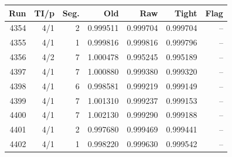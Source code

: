 \begin{tabular}{rrrrrrr}\toprule Run & TI/p & Seg. & Old & Raw & Tight & Flag\\\midrule
4354 & 4/1 & 2 & 0.999511 & 0.999704 & 0.999704 & --\\
4355 & 4/1 & 1 & 0.999816 & 0.999816 & 0.999796 & --\\
4356 & 4/2 & 7 & 1.000478 & 0.995245 & 0.995189 & --\\
4397 & 4/1 & 7 & 1.000880 & 0.999380 & 0.999320 & --\\
4398 & 4/1 & 6 & 0.998581 & 0.999219 & 0.999149 & --\\
4399 & 4/1 & 7 & 1.001310 & 0.999237 & 0.999153 & --\\
4400 & 4/1 & 7 & 1.002130 & 0.999290 & 0.999188 & --\\
4401 & 4/1 & 2 & 0.997680 & 0.999469 & 0.999441 & --\\
4402 & 4/1 & 1 & 0.998220 & 0.999630 & 0.999542 & --\\
\bottomrule\end{tabular}